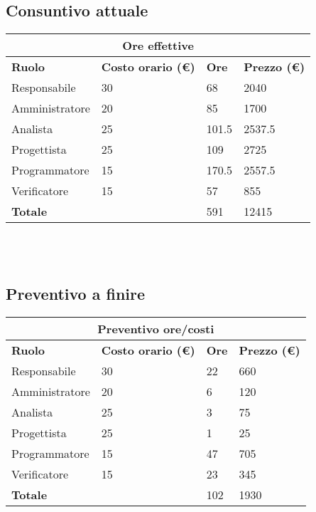 \documentclass[a4paper, 12pt]{article}
\begin{document}
\subsection{Consuntivo attuale}
\begin{center}
    \begin{tabularx}{\textwidth}{|X|X|X|X|}
        \hline
        \multicolumn{4}{|c|}{\textbf{Ore effettive}}\\
        \hline
        \hline
        \textbf{Ruolo} & \textbf{Costo orario (\euro)} & \textbf{Ore} & \textbf{Prezzo (\euro)}\\
        \hline
        Responsabile    & 30 & 68  & 2040\\
        \hline
        Amministratore  & 20 & 85  & 1700\\
        \hline
        Analista        & 25 & 101.5  & 2537.5 \\
        \hline
        Progettista     & 25 & 109  & 2725\\
        \hline
        Programmatore   & 15 & 170.5  & 2557.5\\
        \hline
        Verificatore    & 15 & 57  & 855 \\
        \hline
        \hline
        \textbf{Totale} &    & 591 & 12415\\
        \hline
    \end{tabularx}\\[8pt]
    \mbox{}\\
\end{center}

\subsection{Preventivo a finire}
\begin{center}
    \begin{tabularx}{\textwidth}{|X|X|X|X|}
        \hline
        \multicolumn{4}{|c|}{\textbf{Preventivo ore/costi}}\\
        \hline
        \hline
        \textbf{Ruolo} & \textbf{Costo orario (\euro)} & \textbf{Ore} & \textbf{Prezzo (\euro)}\\
        \hline
        Responsabile    & 30 & 22  & 660\\
        \hline
        Amministratore  & 20 & 6  & 120\\
        \hline
        Analista        & 25 & 3  & 75\\
        \hline
        Progettista     & 25 & 1  & 25\\
        \hline
        Programmatore   & 15 & 47  & 705\\
        \hline
        Verificatore    & 15 & 23  & 345\\
        \hline
        \hline
        \textbf{Totale} &    & 102 & 1930\\
        \hline
    \end{tabularx}\\[8pt]
    \mbox{}\\
\end{center}
\end{document}
